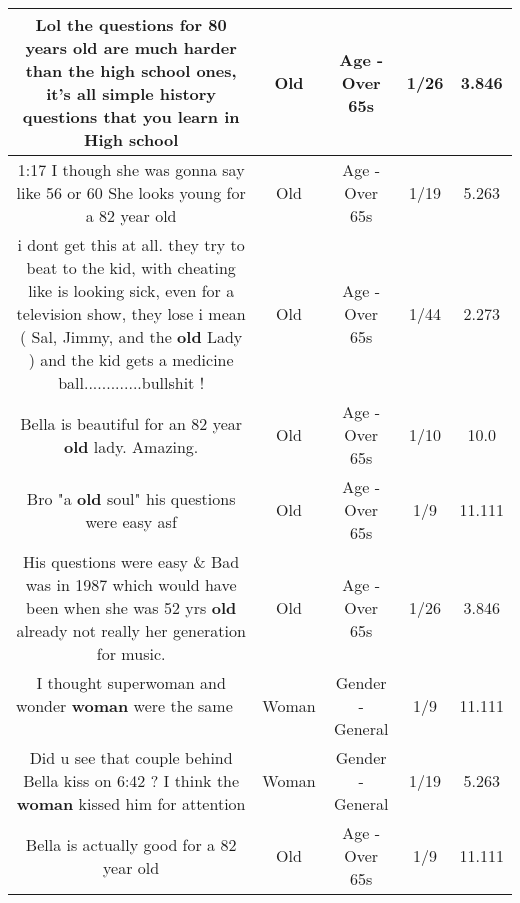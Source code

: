 \documentclass[11pt]{article}
\newlength\mylength
\begin{document}
\begin{center}
\begin{longtable}{|C{.65\mylength}|C{.30\mylength}|C{.12\mylength}|C{.12\mylength}|C{.12\mylength}|}
  \small Lol the questions for 80 years \textbf{old} are much harder than the high school ones, it's all simple history questions that you learn in High school\normalsize   & Old & Age - Over 65s & 1/26 & 3.846 \\  \hline
  \small 1:17 I though she was gonna say like 56 or 60 She looks young for a 82 year old\normalsize   & Old & Age - Over 65s & 1/19 & 5.263 \\  \hline
  \small i dont get this at all. they try to beat to the kid, with cheating like is looking sick,  even for a television show, they lose i mean ( Sal, Jimmy, and the \textbf{old} Lady ) and the kid gets a medicine ball.............bullshit !\normalsize   & Old & Age - Over 65s & 1/44 & 2.273 \\  \hline
  \small Bella is beautiful for an 82 year \textbf{old} lady. Amazing.\normalsize   & Old & Age - Over 65s & 1/10 & 10.0 \\  \hline
  \small Bro "a \textbf{old} soul" his questions were easy asf\normalsize   & Old & Age - Over 65s & 1/9 & 11.111 \\  \hline
  \small His questions were easy \& Bad was in 1987 which would have been when she was 52 yrs \textbf{old} already not really her generation for music.\normalsize   & Old & Age - Over 65s & 1/26 & 3.846 \\  \hline
  \small I thought superwoman and wonder \textbf{woman} were the same🤦🏾‍♂️😂\normalsize   & Woman & Gender - General & 1/9 & 11.111 \\  \hline
  \small Did u see that couple behind Bella kiss on 6:42 ? I think the \textbf{woman} kissed him for attention\normalsize   & Woman & Gender - General & 1/19 & 5.263 \\  \hline
  \small Bella is actually good for a 82 year old\normalsize   & Old & Age - Over 65s & 1/9 & 11.111 \\  \hline

\end{longtable}
\end{center}
\end{document}
